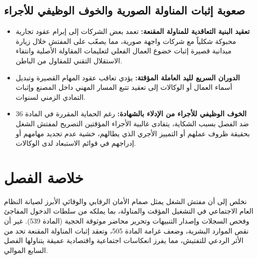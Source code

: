 \subsection{صعوبة إثبات المناولة الصورية والخوف الوظيفي للأجراء}
\begin{tcolorbox}[colback=lightgray, colframe=maincolor, arc=4pt, title={\textbf{عوائق الكشف الميداني للمناولة المقنعة}}]
\begin{itemize}[leftmargin=*, itemsep=5pt]
    \item \textbf{تعقيد البنية التعاقدية للمناولة المقنعة:} تعمد بعض الشركات إلى إبرام عقود تجارية محبوكة شكلياً مع شركات واجهة صورية، مما يصعّب على المفتش خلال زيارة ميدانية قصيرة إثبات خضوع العمال الفعلي لتعليمات المقاولة الأصلية وانتفاء الاستقلال التقني للمقاول من الباطن.
    \item \textbf{الدوران السريع لليد العاملة المؤقتة:} يؤدي تعاقب عقود المهام القصيرة وتبديل أسماء العمال أو الوكالات إلى تعقيد تتبع المسار المهني داخل المصنع وإثبات التمادي الزمني لسنوات.
    \item \textbf{الخوف الوظيفي للأجراء من الإدلاء بالشهادة:} رغم الحماية المقررة في المادة \textenglish{36} ضد الفصل بسبب الشكاية، يتفادى غالبية الأجراء المؤقتين التصريح لمفتش الشغل بحقيقة ظروف عملهم أو التمييز الأجري الذي يطالهم، خشية عدم تجديد مهامهم أو إدراجهم في قوائم الاستبعاد لدى الوكالات.
\end{itemize}
\end{tcolorbox}

\section*{خلاصة الفصل}

نخلص إلى أن مفتش الشغل يمثل صمام الأمان الرقابي والوقائي الأبرز لصيانة النظام العام الاجتماعي في التشغيل المؤقت والمناولة، بما يملكه من سلطات الدخول المفاجئ وفحص السجلات وإصدار التنبيهات وتحرير محاضر موثوقة الحجية (المادة \textenglish{539}). غير أن نقص الموارد البشرية، وضعف غرامة المادة \textenglish{505}، وتعقد إثبات المناولة المقنعة تحد من الأثر الردعي للتفتيش، مما يفرز انعكاسات اجتماعية واقتصادية عميقة يتناولها الفصل السابع الموالي.
